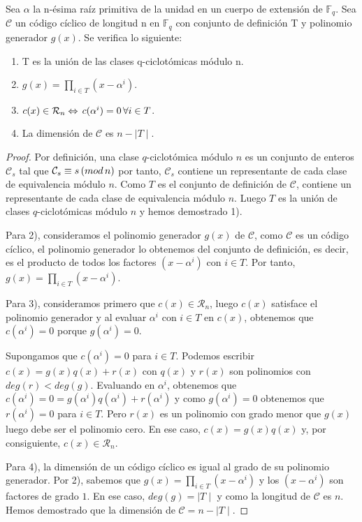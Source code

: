 \begin{theorem}
\label{th:prop_conj_def}

Sea $\alpha$ la n-ésima raíz primitiva de la unidad en un cuerpo de extensión de $\mathbb{F}_q$. Sea $\mathcal{C}$ un código cíclico de longitud n en $\mathbb{F}_q$ con conjunto de definición T y polinomio generador $g(x)$. Se verifica lo siguiente:
\begin{enumerate}
	\item T es la unión de las clases q-ciclotómicas módulo n.
	\item $g(x) = \prod_{i \in T} (x-\alpha^i)$.
	\item $c(x) \in \mathcal{R}_n \Leftrightarrow \thinspace c(\alpha^i) = 0 \thinspace \forall i \in T$.
 	\item La dimensión de $\mathcal{C}$ es $ n - \mid T \mid$.
\end{enumerate}
\end{theorem}

\begin{proof}
    Por definición, una clase $q$-ciclotómica módulo $n$ es un conjunto de enteros $\mathcal{C}_s$ tal que $\mathcal{C}_s \equiv s \thinspace ( mod \thinspace n)$ por tanto, $\mathcal{C}_s$ contiene un representante de cada clase de equivalencia módulo $n$. Como $T$ es el conjunto de definición de $\mathcal{C}$, contiene un representante de cada clase de equivalencia módulo $n$. Luego $T$ es la unión de clases $q$-ciclotómicas módulo $n$ y hemos demostrado 1).

    Para 2), consideramos el polinomio generador $g(x)$ de $\mathcal{C}$, como $\mathcal{C}$ es un código cíclico, el polinomio generador lo obtenemos del conjunto de definición, es decir, es el producto de todos los factores $(x-\alpha^i)$ con $i \in T$. Por tanto, $g(x) = \prod_{i \in T} (x-\alpha^i)$.

    Para 3), consideramos primero que $c(x) \in \mathcal{R}_n$, luego $c(x)$ satisface el polinomio generador y al evaluar $\alpha^i$ con $i \in T$ en $c(x)$, obtenemos que $c(\alpha^i) = 0$ porque $g(\alpha^i) = 0$.
    
    Supongamos que $c(\alpha^i) = 0$ para $i \in T$. Podemos escribir $c(x) = g(x)q(x) + r(x)$ con $q(x)$ y $r(x)$ son polinomios con $deg(r) < deg(g)$. Evaluando en $\alpha^i$, obtenemos que $c(\alpha^i) = 0 = g(\alpha^i)q(\alpha^i) + r(\alpha^i) $ y como $g(\alpha^i) = 0$ obtenemos que $r(\alpha^i) = 0$ para $i \in T$. Pero $r(x)$ es un polinomio con grado menor que $g(x)$ luego debe ser el polinomio cero. En ese caso, $c(x) = g(x)q(x) $ y, por consiguiente, $c(x) \in \mathcal{R}_n$.

    Para 4), la dimensión de un código cíclico es igual al grado de su polinomio generador. Por 2), sabemos que $g(x) = \prod_{i \in T} (x-\alpha^i)$ y los $(x-\alpha^i)$ son factores de grado $1$. En ese caso, $deg(g) = \mid T \mid$ y como la longitud de $\mathcal{C}$ es $n$. Hemos demostrado que la dimensión de $\mathcal{C} = n - \mid T \mid $.

    
\end{proof}

